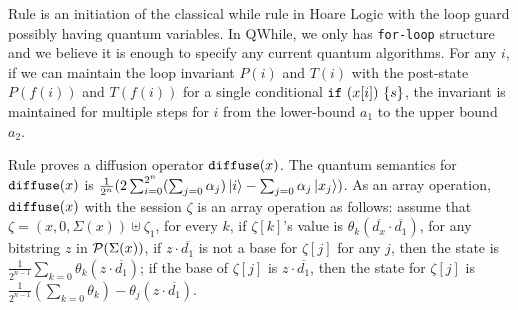 Rule  is an initiation of the classical while rule in Hoare Logic with the loop guard possibly having quantum variables.
In QWhile, we only has \texttt{for-loop} structure and we believe it is enough to specify any current quantum algorithms.
For any $i$, if we can maintain the loop invariant $P(i)$ and $T(i)$ with the post-state $P(f(i))$ and $T(f(i))$
for a single conditional $\texttt{if}~{(x[i])}~{\{s\}}$, the invariant is maintained for multiple steps
for $i$ from the lower-bound $a_1$ to the upper bound $a_2$.

Rule  proves a diffusion operator $\texttt{diffuse}(x)$.
The quantum semantics for $\texttt{diffuse}(x)$ is $\frac{1}{2^{n}}(2\sum_{i=0}^{2^n}(\sum_{j=0}\alpha_j)\left\vert{i}\right\rangle - \sum_{j=0}\alpha_j\left\vert{x_j}\right\rangle)$.
As an array operation, $\texttt{diffuse}(x)$ with the session $\zeta$ is an array operation as follows:
assume that $\zeta=(x,0,\Sigma(x))\uplus\zeta_1$, for every $k$,
if $\zeta[k]$'s value is $\theta_k(\overline{d_x}\cdot \overline{d_1})$,
for any bitstring $z$ in $\mathcal{P}(\Sigma(x))$, if $z\cdot \overline{d_1}$
is not a base for $\zeta[j]$ for any $j$, then the state is
$\frac{1}{2^{n-1}}\sum_{k=0}\theta_k(z\cdot \overline{d_1})$;
if the base of $\zeta[j]$ is $z\cdot \overline{d_1}$,
then the state for $\zeta[j]$ is $\frac{1}{2^{n-1}}(\sum_{k=0}\theta_k)-\theta_j(z\cdot \overline{d_1})$.







